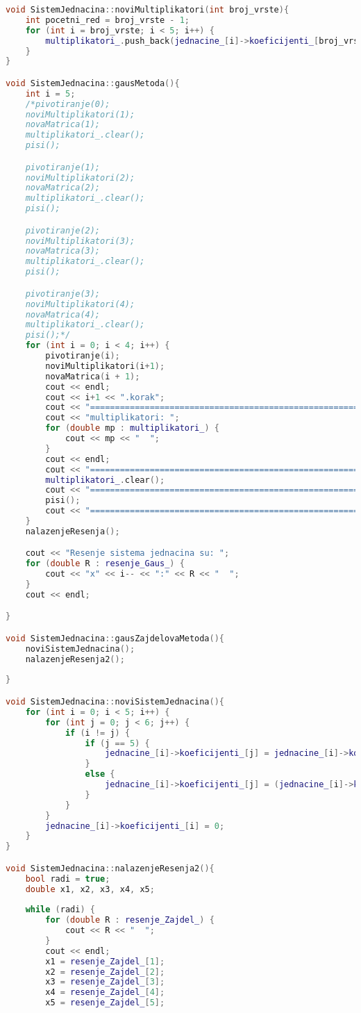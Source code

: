 \documentclass[12pt,leqno,a4paper]{article}
\begin{document}
\begin{lstlisting}[language=C++ ]
void SistemJednacina::noviMultiplikatori(int broj_vrste){
	int pocetni_red = broj_vrste - 1;
	for (int i = broj_vrste; i < 5; i++) {
		multiplikatori_.push_back(jednacine_[i]->koeficijenti_[broj_vrste-1]/ jednacine_[pocetni_red]->koeficijenti_[broj_vrste-1]);
	}
}

void SistemJednacina::gausMetoda(){
	int i = 5;
	/*pivotiranje(0);
	noviMultiplikatori(1);
	novaMatrica(1);
	multiplikatori_.clear();
	pisi();

	pivotiranje(1);
	noviMultiplikatori(2);
	novaMatrica(2);
	multiplikatori_.clear();
	pisi();

	pivotiranje(2);
	noviMultiplikatori(3);
	novaMatrica(3);
	multiplikatori_.clear();
	pisi();

	pivotiranje(3);
	noviMultiplikatori(4);
	novaMatrica(4);
	multiplikatori_.clear();
	pisi();*/
	for (int i = 0; i < 4; i++) {
		pivotiranje(i);
		noviMultiplikatori(i+1);
		novaMatrica(i + 1);
		cout << endl;
		cout << i+1 << ".korak";
		cout << "======================================================" << endl;
		cout << "multiplikatori: ";
		for (double mp : multiplikatori_) {
			cout << mp << "  ";
		}
		cout << endl;
		cout << "======================================================" << endl;
		multiplikatori_.clear();
		cout << "======================================================" << endl;
		pisi();
		cout << "======================================================" << endl;
	}
	nalazenjeResenja();

	cout << "Resenje sistema jednacina su: ";
	for (double R : resenje_Gaus_) {
		cout << "x" << i-- << ":" << R << "  ";
	}
	cout << endl;

}

void SistemJednacina::gausZajdelovaMetoda(){
	noviSistemJednacina();
	nalazenjeResenja2();
	
}

void SistemJednacina::noviSistemJednacina(){
	for (int i = 0; i < 5; i++) {
		for (int j = 0; j < 6; j++) {
			if (i != j) {
				if (j == 5) {
					jednacine_[i]->koeficijenti_[j] = jednacine_[i]->koeficijenti_[j] / jednacine_[i]->koeficijenti_[i];
				}
				else {
					jednacine_[i]->koeficijenti_[j] = (jednacine_[i]->koeficijenti_[j] / jednacine_[i]->koeficijenti_[i])*(-1);
				}
			}			
		}
		jednacine_[i]->koeficijenti_[i] = 0;
	}
}

void SistemJednacina::nalazenjeResenja2(){
	bool radi = true;
	double x1, x2, x3, x4, x5;
	
	while (radi) {
		for (double R : resenje_Zajdel_) {
			cout << R << "  ";
		}
		cout << endl;
		x1 = resenje_Zajdel_[1];
		x2 = resenje_Zajdel_[2];
		x3 = resenje_Zajdel_[3];
		x4 = resenje_Zajdel_[4];
		x5 = resenje_Zajdel_[5];


\end{lstlisting}
\end{document}
